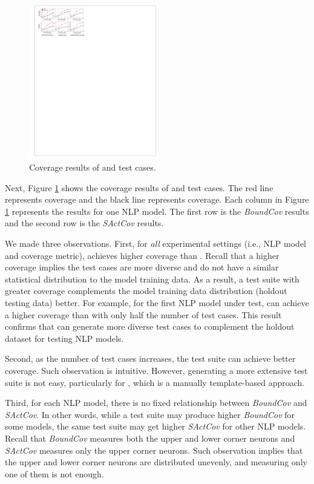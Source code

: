 
\begin{figure}
    \centering
    \includegraphics[width=0.5\textwidth]{figs/coverage.pdf}
    \vspace{-4mm}
    \caption{Coverage results of \tool and \Cklst test cases.}
    \label{fig:coverage}
\end{figure}

Next, Figure \ref{fig:coverage} shows the coverage results of \tool and \Cklst test cases. The red line represents \tool coverage and the black line represents \Cklst coverage. Each column in Figure \ref{fig:coverage} represents the results for one NLP model. The first row is the \textit{BoundCov} results and the second row is the \textit{SActCov} results.

We made three observations.
First, for \emph{all} experimental settings (i.e., NLP model and coverage metric), \tool achieves higher coverage than \Cklst. Recall that a higher coverage implies the test cases are more diverse and do not have a similar statistical distribution to the model training data. As a result, a test suite with greater coverage complements the model training data distribution (\ie holdout testing data) better.
For example, for the first NLP model under test, \tool can achieve a higher coverage than \Cklst with only half the number of test cases.
This result confirms that \tool can generate more diverse test cases to complement the holdout dataset for testing NLP models.

Second, as the number of test cases increases, the test suite can achieve better coverage. Such observation is intuitive. However, generating a more extensive test suite is not easy, particularly  for \Cklst, which is a manually template-based approach.

Third, for each NLP model, there is no fixed relationship between \textit{BoundCov} and \textit{SActCov}. In other words, while a test suite may produce higher \textit{BoundCov} for some models, the same test suite may get higher \textit{SActCov} for other NLP models.
Recall that \textit{BoundCov} measures both the upper and lower corner neurons and \textit{SActCov} measures only the upper corner neurons. 
Such observation implies that the upper and lower corner neurons are distributed unevenly, and measuring only one of them is not enough.